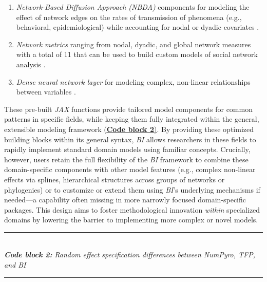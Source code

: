 \documentclass[num-refs]{wiley-article}
\begin{document}
\begin{enumerate}
  \item \textit{Network-Based Diffusion Approach (NBDA)} components for modeling the effect of network edges on the rates of transmission of phenomena (e.g., behavioral, epidemiological) while accounting for nodal or dyadic covariates \citep{hoppitt2011detecting}.

  \item \textit{Network metrics} ranging from nodal, dyadic, and global network measures with a total of 11 that can be used to build custom models of social network analysis \citep{sosa2021network}.

  \item \textit{Dense neural network layer} for modeling complex, non-linear relationships between variables \citep{phan2019composable}.

  
\end{enumerate}

These pre-built \textit{JAX} functions provide tailored model components for common patterns in specific fields, while keeping them fully integrated within the general, extensible modeling framework \hyperref[code:block2_example]{(\textbf{Code block 2})}. By providing these optimized building blocks within its general syntax, \textit{BI} allows researchers in these fields to rapidly implement standard domain models using familiar concepts. Crucially, however, users retain the full flexibility of the \textit{BI} framework to combine these domain-specific components with other model features (e.g., complex non-linear effects via splines, hierarchical structures across groups of networks or phylogenies) or to customize or extend them using \textit{BI}'s underlying mechanisms if needed—a capability often missing in more narrowly focused domain-specific packages. This design aims to foster methodological innovation \textit{within} specialized domains by lowering the barrier to implementing more complex or novel models.

\label{code:block2_example} 
\noindent\rule{\linewidth}{0.4pt}\\[0pt] %
\noindent\textbf{\textit{Code block 2: }} \textit{Random effect specification differences between NumPyro, TFP, and BI}\\[-10pt]
\noindent\rule{\linewidth}{0.4pt}\\[-8pt] %
\vspace{-\parskip}\vspace{0pt}
\end{document}

